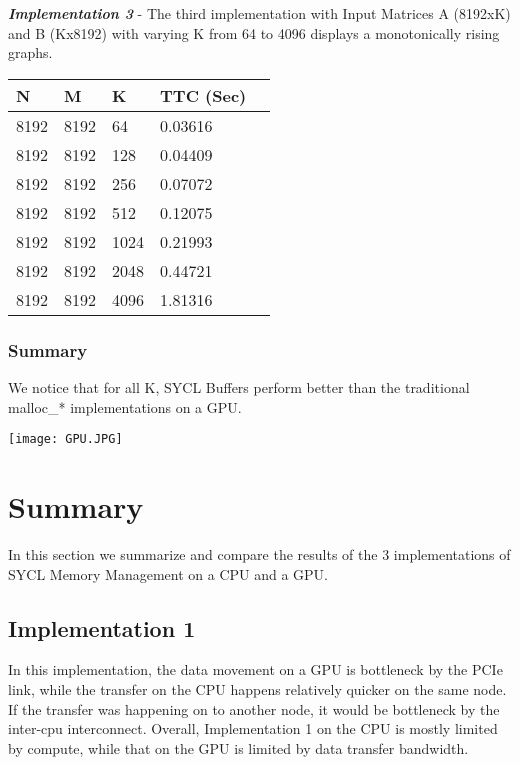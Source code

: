 \documentclass[14pt,fleqn]{article}
\begin{document}
\textit{\textbf{Implementation 3}} - The third implementation with Input Matrices A (8192xK) and B (Kx8192) with varying K from 64 to 4096 displays a monotonically rising graphs.\\

\begin{center}
\begin{tabular}{|l|l|l|l|l|}                                   
    \hline\hline         
    N  & M & K & TTC (Sec) \\
    \hline\hline
    8192 & 8192 & 64 & 0.03616 \\ \hline
    8192 & 8192 & 128 & 0.04409 \\ \hline
    8192 & 8192 & 256 & 0.07072 \\ \hline
    8192 & 8192 & 512 & 0.12075 \\ \hline
    8192 & 8192 & 1024 & 0.21993 \\ \hline
    8192 & 8192 & 2048 & 0.44721 \\ \hline
    8192 & 8192 & 4096 & 1.81316 \\ \hline

\end{tabular}
\end{center}

\subsubsection{Summary}
We notice that for all K, SYCL Buffers perform better than the traditional malloc\_* implementations on a GPU.\\  

\begin{center}
\texttt{[image: GPU.JPG]}
\end{center}

\section{Summary}
In this section we summarize and compare the results of the 3 implementations of SYCL Memory Management on a CPU and a GPU. 

\subsection{Implementation 1}
In this implementation, the data movement on a GPU is bottleneck by the PCIe link, while the transfer on the CPU happens relatively quicker on the same node. If the transfer was happening on to another node, it would be bottleneck by the inter-cpu interconnect.
Overall, Implementation 1 on the CPU is mostly limited by compute, while that on the GPU is limited by data transfer bandwidth. 
\end{document}

